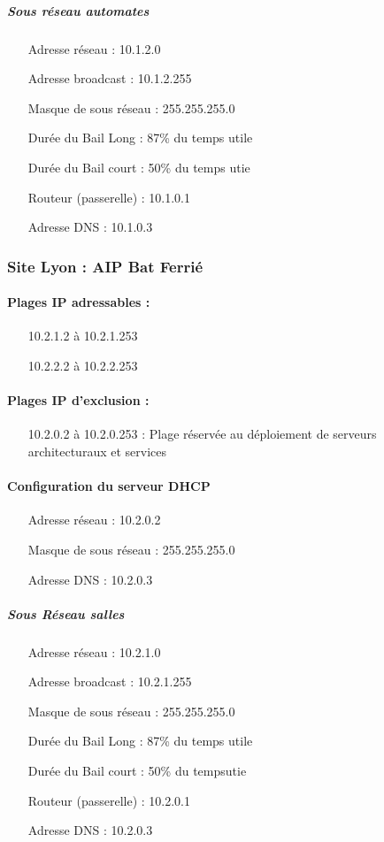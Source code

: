 \documentclass[a4paper]{article}
\begin{document}
\subparagraph{Sous réseau automates}
\begin{itemize}
\item[Adresse réseau]: 10.1.2.0
\item[Adresse broadcast]: 10.1.2.255
\item[Masque de sous réseau]: 255.255.255.0
\item[Durée du Bail Long]: 87\% du temps utile
\item[Durée du Bail court]: 50\% du temps utie
\item[Routeur (passerelle)]: 10.1.0.1
\item[Adresse DNS]: 10.1.0.3
\end{itemize}

\subsubsection{Site Lyon : AIP Bat Ferrié}

\paragraph{Plages IP adressables :} 
\begin{itemize}
\item[10.2.1.2 à 10.2.1.253]
\item[10.2.2.2 à 10.2.2.253]
\end{itemize}

\paragraph{Plages IP d'exclusion :}
\begin{itemize}
\item[10.2.0.2 à 10.2.0.253] : Plage réservée au déploiement de serveurs architecturaux et services
\end{itemize}

\paragraph{Configuration du serveur DHCP}

\begin{itemize}
\item[Adresse réseau]: 10.2.0.2
\item[Masque de sous réseau]: 255.255.255.0
\item[Adresse DNS]: 10.2.0.3
\end{itemize}

\subparagraph{Sous Réseau salles}
\begin{itemize}
\item[Adresse réseau]: 10.2.1.0
\item[Adresse broadcast]: 10.2.1.255
\item[Masque de sous réseau]: 255.255.255.0
\item[Durée du Bail Long]: 87\% du temps utile
\item[Durée du Bail court]: 50\% du tempsutie
\item[Routeur (passerelle)]: 10.2.0.1
\item[Adresse DNS]: 10.2.0.3
\end{itemize}
\end{document}
